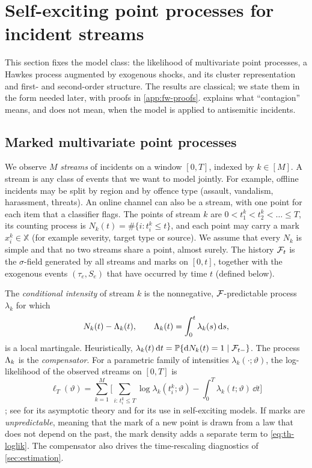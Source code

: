 \section{Self-exciting point processes for incident streams}\label{sec:framework}

This section fixes the model class: the likelihood of multivariate point processes, a
Hawkes process augmented by exogenous shocks, and its cluster representation and
first- and second-order structure. The results are classical; we state them in the form
needed later, with proofs in \cref{app:fw-proofs}.  explains what
``contagion'' means, and does not mean, when the model is applied to antisemitic
incidents.

\subsection{Marked multivariate point processes}\label{sec:th-mpp}

We observe $M$ \emph{streams} of incidents on a window $[0,T]$, indexed by $k\in[M]$.
A stream is any class of events that we want to model jointly. For example, offline
incidents may be split by region and by offence type (assault, vandalism, harassment,
threats). An online channel can also be a stream, with one point for each item that a
classifier flags. The points of stream $k$ are $0<t^k_1<t^k_2<\dots\le T$, its counting
process is $N_k(t)=\#\{i:t^k_i\le t\}$, and each point may carry a mark
$x^k_i\in\mathbb X$ (for example severity, target type or source). We assume that
every $N_k$ is simple and that no two streams share a point, almost surely. The history
$\mathcal{F}_t$ is the $\sigma$-field generated by all streams and marks on $[0,t]$, together
with the exogenous events $(\tau_e,S_e)$ that have occurred by time $t$ (defined below).

The \emph{conditional intensity} of stream $k$ is the nonnegative, $\mathcal{F}$-predictable
process $\lambda_k$ for which
\[
N_k(t)-\Lambda_k(t),\qquad \Lambda_k(t)=\int_0^t\lambda_k(s)\,\mathrm{d} s,
\]
is a local martingale. Heuristically,
$\lambda_k(t)\,\mathrm{d} t=\mathbb{P}\{\mathrm{d}N_k(t)=1\mid\mathcal{F}_{t-}\}$. The process $\Lambda_k$ is the
\emph{compensator}. For a parametric family of intensities $\lambda_k(\cdot;\vartheta)$,
the log-likelihood of the observed streams on $[0,T]$ is
\begin{equation}\label{eq:th-loglik}
  \ell_T(\vartheta)=\sum_{k=1}^{M}\Big[\sum_{i:\,t^k_i\le T}\log\lambda_k(t^k_i;\vartheta)
  -\int_0^T\lambda_k(t;\vartheta)\,\dd t\Big]
\end{equation}
\citep[Ch.~7]{daley2003}; see \citet{ogata1978} for its asymptotic theory and
\citet{ogata1988} for its use in self-exciting models. If marks are
\emph{unpredictable}, meaning that the mark of a new point is drawn from a law that does
not depend on the past, the mark density adds a separate term to \eqref{eq:th-loglik}.
The compensator also drives the time-rescaling diagnostics of \cref{sec:estimation}.

